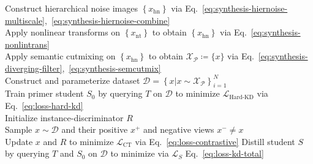 \begin{center}
\begin{minipage}{0.80\linewidth}
\begin{algorithm}[H] %
    
    \caption{Proposed method \textbf{\methodname}}
    \label{alg:dipkd}


    \vspace{-0.5\baselineskip}
    \Comment{\noindent\hrulefill}

    \vspace{0.5\baselineskip}
    Construct hierarchical noise images $\left\{ x_\text{hn} \right\}$ via Eq.~\ref{eq:synthesis-hiernoise-multiscale},~\ref{eq:synthesis-hiernoise-combine} \\
    Apply nonlinear transforms on $\left\{ x_\text{nt}\right\}$ to obtain $\left\{x_\text{hn} \right\}$ via Eq.~\ref{eq:synthesis-nonlintrans} \\
    Apply semantic cutmixing on $\left\{x_\text{hn} \right\}$ to obtain $\mathcal{X}_\mathcal{P} \coloneq \{x\}$ via Eq.~\ref{eq:synthesis-diverging-filter},~\ref{eq:synthesis-semcutmix} \\
    
    \vspace{0.5\baselineskip}
    Construct and parameterize dataset $\mathcal{D} = \left\{ x | x \sim \mathcal{X}_\mathcal{P} \right\}_{i=1}^N$ \\
    Train primer student $S_0$ by querying $T$ on $\mathcal{D}$ to minimize $\mathcal{L}_\text{Hard-KD}$ via Eq.~\ref{eq:loss-hard-kd} \\
    Initialize instance-discriminator $R$ \\
     {
        Sample $x\sim\mathcal{D}$ and their positive $x^+$ and negative views $x^- \ne x$ \\
        Update $x$ and $R$ to minimize $\mathcal{L}_\text{CT}$ via Eq.~\ref{eq:loss-contrastive}
    }
    \vspace{0.5\baselineskip}
    Distill student $S$ by querying $T$ and $S_0$ on $\mathcal{D}$ to minimize via $\mathcal{L}_{S}$ Eq.~\ref{eq:loss-kd-total}


    \vspace{0.5\baselineskip}
\end{algorithm}
\end{minipage}
\end{center}
